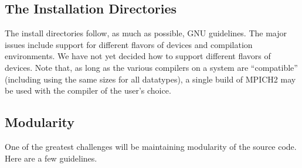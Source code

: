 \documentclass{article}
\begin{document}
\subsection{The Installation Directories}
\label{sec:install-dirs}
The install directories follow, as
much as possible, GNU guidelines.  The major issues include support
for different flavors of devices and compilation environments.  
We have not yet decided how to support different flavors of devices.
Note that, as long as the various compilers on a system are
``compatible'' (including using the same sizes for all datatypes), a
single build of MPICH2 may be used with the compiler of the user's
choice.


\subsection{Modularity}
\label{sec:modularity}
One of the greatest challenges will be maintaining modularity of the source
code.  Here are a few guidelines.
\end{document}
